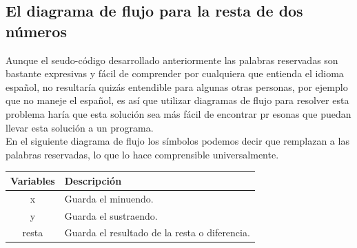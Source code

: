 \documentclass[a4paper,12pt,spanish]{article}
\begin{document}
\subsection{El diagrama de flujo para la resta de dos números}
\label{sec:el-diagrama-de-1}
Aunque el seudo-código desarrollado anteriormente las palabras
reservadas son bastante expresivas y fácil de comprender por
cualquiera que entienda el idioma español, no resultaría quizás
entendible para algunas otras personas, por ejemplo que no maneje el
español, es así que utilizar diagramas de flujo para resolver esta
problema haría que esta solución sea más fácil de encontrar pr esonas
que puedan llevar esta solución a un programa.\\

En el siguiente diagrama de flujo los símbolos podemos decir que
remplazan a las palabras reservadas, lo que lo hace comprensible
universalmente.




  \begin{minipage}[H]{0.45\linewidth}

\begin{center}
\end{center}
\end{minipage}
\begin{minipage}[H]{0.45\linewidth}
  \begin{table}[H]
    \centering
    \begin{tabular}[H]{|c|m{4cm}|}
      \hline
      \rowcolor{lightgray!30}
      
      Variables & Descripción \\
      \hline
      x & Guarda el minuendo. \\ \hline 
      y & Guarda el sustraendo.  \\ \hline
      resta & Guarda el resultado de la resta o diferencia.  \\ \hline
      
    \end{tabular}
  \end{table}
\end{minipage}
\end{document}
